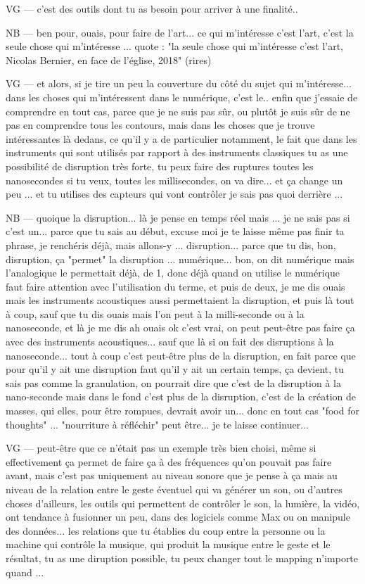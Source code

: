VG — c'est des outils dont tu as besoin pour arriver à une finalité..

NB — ben pour, ouais, pour faire de l'art... ce qui m'intéresse c'est l'art, c'est la seule chose qui m'intéresse ... quote : "la seule chose qui m'intéresse c'est l'art, Nicolas Bernier, en face de l'église, 2018" (rires) 

VG — et alors, si je tire un peu la couverture du côté du sujet qui m'intéresse... dans les choses qui m'intéressent dans le numérique, c'est le.. enfin que j'essaie de comprendre en tout cas, parce que je ne suis pas sûr, ou plutôt je suis sûr de ne pas en comprendre tous les contours, mais dans les choses que je trouve intéressantes là dedans, ce qu'il y a de particulier notamment, le fait que dans les instruments qui sont utilisés par rapport à des instruments classiques tu as une possibilité de disruption très forte, tu peux faire des ruptures toutes les nanosecondes si tu veux, toutes les millisecondes, on va dire... et ça change un peu ... et tu utilises des capteurs qui vont contrôler je sais pas quoi derrière ...

NB — quoique la disruption... là je pense en temps réel mais ... je ne sais pas si c'est un...  parce que tu sais au début, excuse moi je te laisse même pas finir ta phrase, je renchéris déjà, mais allons-y ... disruption...  parce que tu dis, bon, disruption, ça "permet" la disruption ... numérique... bon, on dit numérique mais l'analogique le permettait déjà, de 1, donc déjà quand on utilise le numérique faut faire attention avec l'utilisation du terme, et puis de deux, je me dis ouais mais les instruments acoustiques aussi permettaient la disruption, et puis là tout à coup, sauf que tu dis ouais mais l'on peut à la milli-seconde ou à la nanoseconde, et là je me dis ah ouais ok c'est vrai, on peut peut-être pas faire ça avec des instruments acoustiques...  sauf que là si on fait des disruptions à la nanoseconde... tout à coup c'est peut-être plus de la disruption, en fait parce que pour qu'il y ait une disruption faut qu'il y ait un certain temps, ça devient, tu sais pas comme la granulation, on pourrait dire que c'est de la disruption à la nano-seconde mais dans le fond c'est plus de la disruption, c'est de la création de masses, qui elles, pour être rompues, devrait avoir un... donc en tout cas "food for thoughts" ... "nourriture à réfléchir" peut être... je te laisse continuer... 

VG —  peut-être que ce n'était pas un exemple très bien choisi, même si effectivement ça permet de faire ça à des fréquences qu'on pouvait pas faire avant, mais c'est pas uniquement au niveau sonore que je pense à ça mais au niveau de la relation entre le geste éventuel qui va générer un son, ou d'autres choses d'ailleurs, les outils qui permettent de contrôler le son, la lumière, la vidéo, ont tendance à fusionner un peu, dans des logiciels comme Max ou on manipule des données... les relations que tu établies du coup entre la personne ou la machine qui contrôle la musique, qui produit la musique entre le geste et le résultat, tu as une diruption possible, tu peux changer tout le mapping n'importe quand ...

